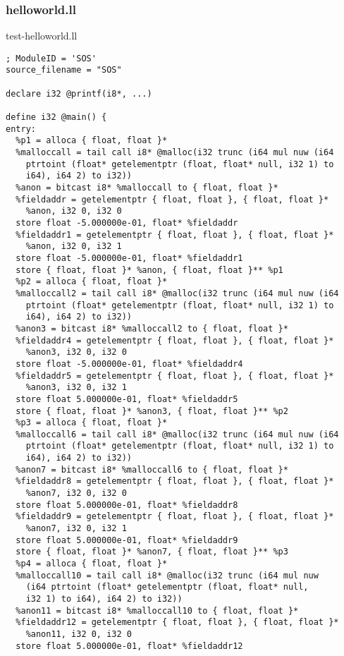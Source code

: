 \documentclass[main.tex]{subfiles}
\begin{document}
\subsubsection{helloworld.ll}
{\small	
\colorbox{green!30}{test-helloworld.ll}
\begin{lstlisting}
; ModuleID = 'SOS'
source_filename = "SOS"

declare i32 @printf(i8*, ...)

define i32 @main() {
entry:
  %p1 = alloca { float, float }*
  %malloccall = tail call i8* @malloc(i32 trunc (i64 mul nuw (i64 
    ptrtoint (float* getelementptr (float, float* null, i32 1) to 
    i64), i64 2) to i32))
  %anon = bitcast i8* %malloccall to { float, float }*
  %fieldaddr = getelementptr { float, float }, { float, float }* 
    %anon, i32 0, i32 0
  store float -5.000000e-01, float* %fieldaddr
  %fieldaddr1 = getelementptr { float, float }, { float, float }* 
    %anon, i32 0, i32 1
  store float -5.000000e-01, float* %fieldaddr1
  store { float, float }* %anon, { float, float }** %p1
  %p2 = alloca { float, float }*
  %malloccall2 = tail call i8* @malloc(i32 trunc (i64 mul nuw (i64 
    ptrtoint (float* getelementptr (float, float* null, i32 1) to 
    i64), i64 2) to i32))
  %anon3 = bitcast i8* %malloccall2 to { float, float }*
  %fieldaddr4 = getelementptr { float, float }, { float, float }* 
    %anon3, i32 0, i32 0
  store float -5.000000e-01, float* %fieldaddr4
  %fieldaddr5 = getelementptr { float, float }, { float, float }* 
    %anon3, i32 0, i32 1
  store float 5.000000e-01, float* %fieldaddr5
  store { float, float }* %anon3, { float, float }** %p2
  %p3 = alloca { float, float }*
  %malloccall6 = tail call i8* @malloc(i32 trunc (i64 mul nuw (i64 
    ptrtoint (float* getelementptr (float, float* null, i32 1) to 
    i64), i64 2) to i32))
  %anon7 = bitcast i8* %malloccall6 to { float, float }*
  %fieldaddr8 = getelementptr { float, float }, { float, float }* 
    %anon7, i32 0, i32 0
  store float 5.000000e-01, float* %fieldaddr8
  %fieldaddr9 = getelementptr { float, float }, { float, float }* 
    %anon7, i32 0, i32 1
  store float 5.000000e-01, float* %fieldaddr9
  store { float, float }* %anon7, { float, float }** %p3
  %p4 = alloca { float, float }*
  %malloccall10 = tail call i8* @malloc(i32 trunc (i64 mul nuw 
    (i64 ptrtoint (float* getelementptr (float, float* null, 
    i32 1) to i64), i64 2) to i32))
  %anon11 = bitcast i8* %malloccall10 to { float, float }*
  %fieldaddr12 = getelementptr { float, float }, { float, float }* 
    %anon11, i32 0, i32 0
  store float 5.000000e-01, float* %fieldaddr12

\end{lstlisting}}
\end{document}
